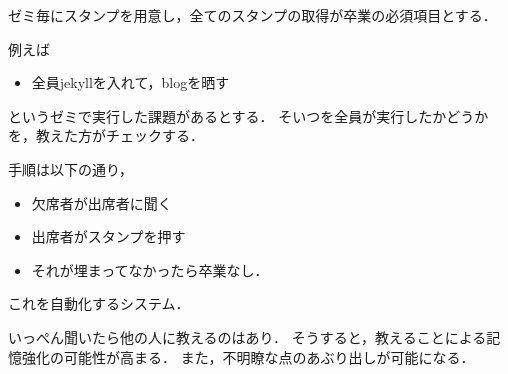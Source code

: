 \documentclass[a4,p11]{article}
\begin{document}
ゼミ毎にスタンプを用意し，全てのスタンプの取得が卒業の必須項目とする．

例えば
\begin{itemize}
\item 全員jekyllを入れて，blogを晒す
\end{itemize}
というゼミで実行した課題があるとする．
そいつを全員が実行したかどうかを，教えた方がチェックする．

手順は以下の通り，
\begin{itemize}
\item 欠席者が出席者に聞く
\item 出席者がスタンプを押す
\item それが埋まってなかったら卒業なし．
\end{itemize}
これを自動化するシステム．

いっぺん聞いたら他の人に教えるのはあり．
そうすると，教えることによる記憶強化の可能性が高まる．
また，不明瞭な点のあぶり出しが可能になる．
\end{document}
